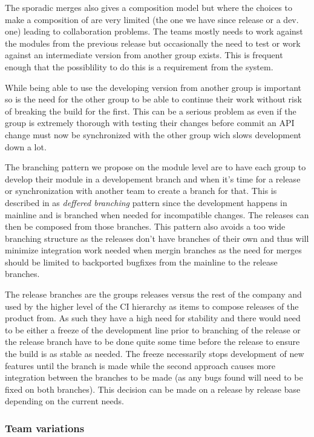 \documentclass[a4paper,11pt]{article}
\begin{document}
The sporadic merges also gives a composition model but where the choices to make
a composition of are very limited (the one we have since release or a dev. one)
leading to collaboration problems. The teams mostly needs to work against the
modules from the previous release but occasionally the need to test or work
against an intermediate version from another group exists. This is frequent
enough that the possiblility to do this is a requirement from the system.

While being able to use the developing version from another group is important
so is the need for the other group to be able to continue their work without
risk of breaking the build for the first. This can be a serious problem as even
if the group is extremely thorough with testing their changes before commit an
API change must now be synchronized with the other group wich slows development
down a lot. 

The branching pattern we propose on the module level are to have each group to 
develop their module in  a developement branch and when it's time for a release
or synchronization with another team to create a branch for that. This is
described in \cite{StreamedLines} as \emph{deffered branching} pattern since
the development happens in mainline and is branched when needed for
incompatible changes. The releases can then be composed from those branches.
This pattern also avoids a too wide branching structure as the releases don't
have branches of their own and thus will minimize integration work needed when
mergin branches as the need for merges should be limited to backported
bugfixes from the mainline to the release branches. 

The release branches are the groups releases versus the rest of the company and
used by the higher level of the CI hierarchy as items to compose releases of
the product from. As such they have a high need for stability and there would
need to be either a freeze of the development line prior to branching of the
release or the release branch have to be done quite some time before the
release to ensure the build is as stable as needed. The freeze necessarily
stops development of new features until the branch is made while the second
approach causes more integration between the branches to be made (as any bugs
found will need to be fixed on both branches). This decision can be made on a
release by release base depending on the current needs.


\subsubsection{Team variations}
\end{document}
